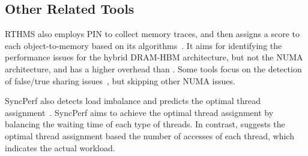 



\subsection{Other Related Tools}
RTHMS also employs PIN to collect memory traces, and then assigns a score to each object-to-memory based on its algorithms~\cite{RTHMS}. It aims for identifying the performance issues for the hybrid DRAM-HBM architecture, but not the NUMA architecture, and has a higher overhead than \NP{}. Some tools focus on the detection of false/true sharing issues~\cite{Sheriff, Predator, Cheetah, DBLP:conf/ppopp/ChabbiWL18, helm2019perfmemplus}, but skipping other NUMA issues. 

SyncPerf also detects load imbalance and predicts the optimal thread assignment~\cite{SyncPerf}. SyncPerf aims to achieve the optimal thread assignment by balancing the waiting time of each type of threads. In contrast, \NP{} suggests the optimal thread assignment based  the number of accesses of each thread, which indicates the actual workload. 





